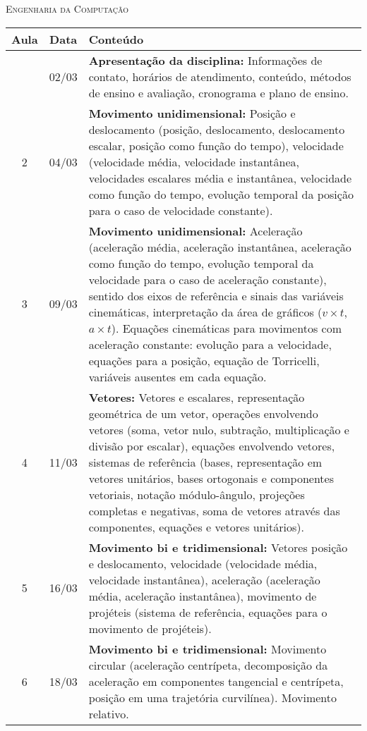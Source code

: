 \vspace{1cm}
\begin{center}
\Large\textsc{Engenharia da Computação}
\end{center}
\begin{center}
\begin{longtable}{ccp{70mm}}
\toprule
Aula & Data & Conteúdo \\
\midrule
\endhead
\bottomrule
\endfoot
  1 & 02/03 & \textbf{Apresentação da disciplina:} Informações de contato, horários de atendimento, conteúdo, métodos de ensino e avaliação, cronograma e plano de ensino.\\
  2 & 04/03 & \textbf{Movimento unidimensional:} Posição e deslocamento (posição, deslocamento, deslocamento escalar, posição como função do tempo), velocidade (velocidade média, velocidade instantânea, velocidades escalares média e instantânea, velocidade como função do tempo, evolução temporal da posição para o caso de velocidade constante).\\
  3 & 09/03 & \textbf{Movimento unidimensional:} Aceleração (aceleração média, aceleração instantânea, aceleração como função do tempo, evolução temporal da velocidade para o caso de aceleração constante), sentido dos eixos de referência e sinais das variáveis cinemáticas, interpretação da área de gráficos ($v \times t$, $a \times  t$). Equações cinemáticas para movimentos com aceleração constante: evolução para a velocidade, equações para a posição, equação de Torricelli, variáveis ausentes em cada equação.\\
  4 & 11/03 & \textbf{Vetores:} Vetores e escalares, representação geométrica de um vetor, operações envolvendo vetores (soma, vetor nulo, subtração, multiplicação e divisão por escalar), equações envolvendo vetores, sistemas de referência (bases, representação em vetores unitários, bases ortogonais e componentes vetoriais, notação módulo-ângulo, projeções completas e negativas, soma de vetores através das componentes, equações e vetores unitários). \\
  5 & 16/03 & \textbf{Movimento bi e tridimensional:} Vetores posição e deslocamento, velocidade (velocidade média, velocidade instantânea), aceleração (aceleração média, aceleração instantânea), movimento de projéteis (sistema de referência, equações para o movimento de projéteis). \\
  6 & 18/03 & \textbf{Movimento bi e tridimensional:} Movimento circular (aceleração centrípeta, decomposição da aceleração em componentes tangencial e centrípeta, posição em uma trajetória curvilínea). Movimento relativo.\\

\end{longtable}
\end{center}
